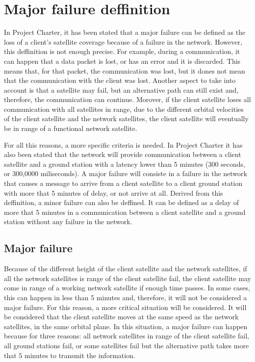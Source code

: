\section{Major failure deffinition}
In Project Charter, it has been stated that a major failure can be defined as the loss of a client’s satellite coverage because of a failure in the network. However, this deffinition is not enough precise. For example, during a communication, it can happen that a data packet is lost, or has an error and it is discarded. This means that, for that packet, the communication was lost, but it dones not mean that the communication with the client was lost. Another aspect to take into account is that a satellite may fail, but an alternative path can still exist and, therefore, the communication can continue. Morover, if the client satellite loses all communication with all satellites in range, due to the different orbital velocities of the client satellite and the network satellites, the client satellite will eventually be in range of a functional network satellite.

For all this reasons, a more specific criteria is needed. In Project Charter it has also been stated that the network will provide communication between a client satellite and a ground station with a latency lower than 5 minutes (300 seconds, or 300,0000 miliseconds). A major failure will consiste in a failure in the network that causes a message to arrive from a client satellite to a client ground station with more that 5 minutes of delay, or not arrive at all. Derived from this deffinition, a minor failure can also be deffined. It can be defined as a delay of more that 5 minutes in a communication between a client satellite and a ground station without any failure in the network.

\subsection{Major failure}
Because of the different height of the client satellite and the network satellites, if all the network satellites is range of the client satellite fail, the client satellite may come in range of a working network satellite if enough time passes. In some cases, this can happen in less than 5 minutes and, therefore, it will not be considered a major failure. For this reason, a more critical situation will be considered. It will be considered that the client satellite moves at the same speed as the network satellites, in the same orbital plane. In this situation, a major failure can happen because for three reasons: all network satellites in range of the client satellite fail, all ground stations fail, or some satellites fail but the alternative path takes more that 5 minutes to transmit the information.

